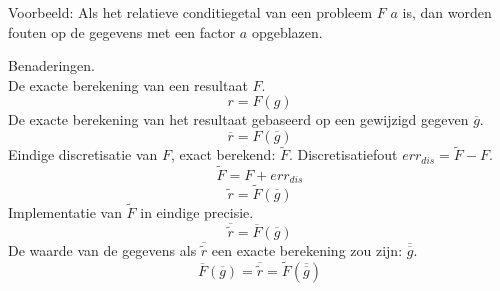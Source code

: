 \documentclass[samenvatting.tex]{subfiles}
\begin{document}
\noindent Voorbeeld: Als het relatieve conditiegetal van een probleem $F$ $a$ is, dan worden fouten op de gegevens met een factor $a$ opgeblazen.
\begin{defi} Benaderingen.\\
De exacte berekening van een resultaat $F$.
\[
r = F(g)
\]
De exacte berekening van het resultaat gebaseerd op een gewijzigd gegeven $\overline{g}$.
\[
\overline{r} = F(\overline{g})
\]
Eindige discretisatie van $F$, exact berekend: $\widetilde{F}$. Discretisatiefout $err_{dis} = \widetilde{F} - F$.
\[
\widetilde{F} = F + err_{dis}
\]
\[
\widetilde{r} = \widetilde{F}(\overline{g})
\]
Implementatie van $\widetilde{F}$ in eindige precisie.
\[
\overline{\widetilde{r}} = \overline{F}(\overline{g})
\]
De waarde van de gegevens als $\overline{\widetilde{r}}$ een exacte berekening zou zijn: $\overline{\overline{g}}$.
\[
\overline{F}(\overline{g}) = \overline{\widetilde{r}} = \widetilde{F}(\overline{\overline{g}})
\]
\end{defi}
\end{document}
